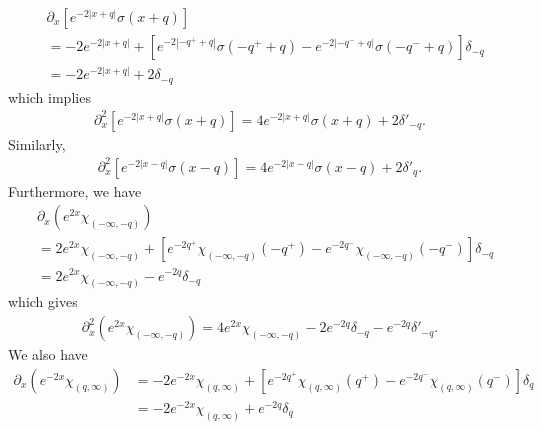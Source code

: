 \documentclass[12pt,reqno]{amsart}
\numberwithin{equation}{section}  %
\numberwithin{figure}{section}
\newcommand{\p}{\partial}
\theoremstyle{plain}  %
\theoremstyle{definition}
\begin{document}
%
%
%
%
%
\begin{equation*}
  \begin{split}
    & \p_x \left[ e^{-2| x+q |} \sigma(x+q) \right]
    \\
    & = -2e^{-2| x+q |} + \left[ e^{-2| -q^{+} + q |} \sigma(-q^{+} + q) -
    e^{-2| -q^{-} + q |} \sigma(-q^{-} + q) \right]\delta_{-q}
    \\
    & = -2e^{-2| x+q |} + 2 \delta_{-q}
  \end{split}
\end{equation*}
%
%
which implies
%
%
\begin{equation}
  \label{7aa}
  \begin{split}
    \p_x^2 \left[ e^{-2| x+q |} \sigma(x+q) \right] = 4e^{-2| x+q |}
    \sigma(x+q) + 2 \delta'_{-q}.
  \end{split}
\end{equation}
%
%
Similarly, 
%
%
\begin{equation}
  \label{8aa}
  \begin{split}
    \p_x^{2}\left[ e^{-2| x-q |}\sigma(x-q) \right] = 4e^{-2| x-q
    |}\sigma(x-q) + 2 \delta'_{q}.
  \end{split}
\end{equation}
%
Furthermore, we have
\begin{equation*}
  \begin{split}
    & \p_x(e^{2x} \chi_{(-\infty, -q)})
    \\
    & = 2e^{2x} \chi_{(-\infty, -q)} + \left[ e^{-2q^{+}}\chi_{(-\infty, -q)}
    (-q^+) - e^{-2q^{-}} \chi_{(-\infty, -q)} (-q^{-}) \right]\delta_{-q}
    \\
    & = 2e^{2x} \chi_{(-\infty, -q)} - e^{-2q} \delta_{-q}
  \end{split}
\end{equation*}
%
%
which gives
%
%
\begin{equation}
  \label{5aa}
  \begin{split}
    \p_x^{2}(e^{2x} \chi_{(-\infty, -q)}) = 4e^{2x} \chi_{(-\infty, -q)} -
    2e^{-2q} \delta_{-q} - e^{-2q} \delta'_{-q}.
  \end{split}
\end{equation}
%
%
We also have
%
%
\begin{equation*}
  \begin{split}
    \p_x (e^{-2x} \chi_{(q, \infty)})
    & = -2e^{-2x} \chi_{(q, \infty)} + \left[ e^{-2q^{+}} \chi_{(q,
    \infty)}(q^{+}) - e^{-2q^{-}} \chi_{(q, \infty)}(q^{-})
    \right]\delta_{q}
    \\
    & = -2e^{-2x} \chi_{(q, \infty)} + e^{-2q} \delta_{q}
  \end{split}
\end{equation*}
\end{document}

